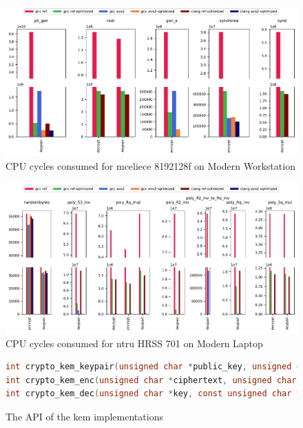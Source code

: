 





\begin{figure}
    \centering
    \includegraphics[width=\textwidth]{chapters/results/micro/mceliece_8192128f_Modern Workstation_cpu-cycles.pdf}
    \caption{CPU cycles consumed for \gls{mceliece} 8192128f on Modern Workstation}
    \label{figure:results:micro:mceliece-8192128f-modern-workstation}
\end{figure}

\begin{figure}
    \centering
    \includegraphics[width=\textwidth]{chapters/results/micro/ntru_hrss701_Modern Laptop_cpu-cycles.pdf}
    \caption{CPU cycles consumed for \gls{ntru} HRSS 701 on Modern Laptop}
    \label{figure:results:micro:ntru-hrss701-modern-laptop}
\end{figure}

\begin{figure}
    \centering
    \begin{lstlisting}[language=C]
int crypto_kem_keypair(unsigned char *public_key, unsigned char *private_key);
int crypto_kem_enc(unsigned char *ciphertext, unsigned char *key, const unsigned char *public_key);
int crypto_kem_dec(unsigned char *key, const unsigned char *ciphertext, const unsigned char *private_key);
    \end{lstlisting}
    \caption{The API of the \acrshort{kem} implementations}
    \label{figure:result:memory:kem-api}
\end{figure}

